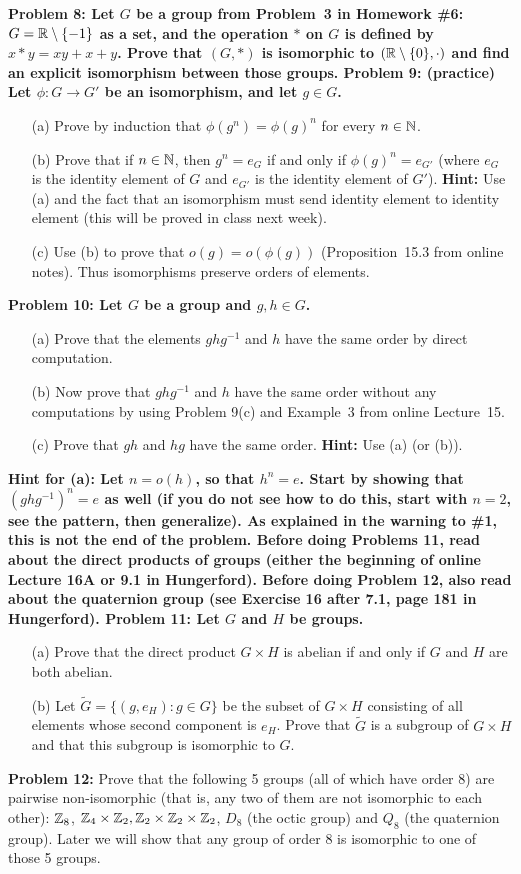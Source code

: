 \documentclass[11pt]{amsart}
\begin{document}
\bf{Problem 8: }\rm Let $G$ be a group from Problem~3 in Homework \#6:
$G={\mathbb R}\setminus\{-1\}$ as a set, and the operation $*$ on $G$ is defined by
$x*y=xy+x+y$. Prove that $(G,*)$ is isomorphic to $({\mathbb R}\setminus\{0\},\cdot)$
and find an explicit isomorphism between those groups.
\skv
\skv
\bf{Problem 9: }\rm (practice) Let $\phi:G\to G'$ be an isomorphism, and let
 $g\in G$.
\begin{itemize}
\item[(a)] Prove by induction that $\phi(g^n)=\phi(g)^n$
for every $n\in{\mathbb N}$.
\item[(b)] Prove that if $n\in{\mathbb N}$, then $g^n=e_G$ if and only
if $\phi(g)^n=e_{G'}$ (where $e_G$ is the identity element of $G$
and $e_{G'}$ is the identity element of $G'$). {\bf Hint:} Use (a)
and the fact that an isomorphism must send identity element to identity element
(this will be proved in class next week).
\item[(c)] Use (b) to prove that $o(g)=o(\phi(g))$ (Proposition~15.3 from online notes). 
Thus isomorphisms preserve orders of elements.
\end{itemize}
\skv
\bf{Problem 10: }\rm Let $G$ be a group and $g,h\in G$.
\begin{itemize}
\item[(a)] Prove that the elements $ghg^{-1}$ and $h$ have the same order
by direct computation.
\item[(b)] Now prove that $ghg^{-1}$ and $h$ have the same order
without any computations by using Problem 9(c) and Example~3 from online Lecture~15.
\item[(c)] Prove that $gh$ and $hg$ have the same order.
{\bf Hint:} Use (a) (or (b)).
\end{itemize}
\bf{Hint for (a): }\rm Let $n=o(h)$, so that $h^n=e$. Start by showing that
$(ghg^{-1})^n=e$ as well (if you do not see how to do
this, start with $n=2$, see the pattern, then generalize). As explained in the warning to \#1,
this is not the end of the problem.
\skv
Before doing Problems 11, read about the direct products of groups (either the beginning of online Lecture 16A or 9.1 in Hungerford).
Before doing Problem 12, also read about the quaternion group (see Exercise 16 after 7.1, page 181 in Hungerford).
\skv
{\bf Problem 11: }\rm Let $G$ and $H$ be groups.
\begin{itemize}
\item[(a)] Prove that the direct product $G\times H$ is abelian if and only if 
$G$ and $H$ are both abelian.
\item[(b)] Let $\widetilde G=\{(g,e_H): g\in G\}$ be the subset of $G\times H$ consisting of all elements whose second component is $e_H$. Prove that $\widetilde G$ is a subgroup of $G\times H$ and that this
subgroup is isomorphic to $G$.   
\end{itemize}
\skv

{\bf Problem 12: }\rm Prove that the following 5 groups (all of which have order $8$) are pairwise non-isomorphic (that is,
any two of them are not isomorphic to each other): ${\mathbb Z}_8$, ${\mathbb Z}_{4}\times {\mathbb Z}_2,{\mathbb Z}_2\times {\mathbb Z}_2\times {\mathbb Z}_2$, $D_8$ (the octic group)
and $Q_8$ (the quaternion group). Later we will show that any group of order $8$ is isomorphic to one of those 5 groups. 
\end{document}
